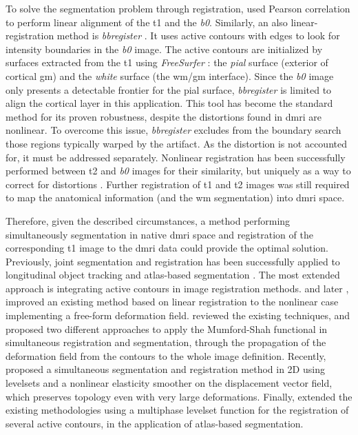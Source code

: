 To solve the segmentation problem through registration, \cite{saad_new_2009} 
  used Pearson correlation to perform linear alignment of the \gls*{t1} and 
  the \emph{b0}.
Similarly, an also linear-registration method is \emph{bbregister} \citep{greve_accurate_2009}.
It uses active contours with edges to look for intensity boundaries in the \emph{b0}
  image.
The active contours are initialized by surfaces extracted from the 
  \gls*{t1} using \emph{FreeSurfer} \citep{fischl_freesurfer_2012}:
  the \emph{pial} surface (exterior of cortical \gls*{gm}) and the \emph{white}
  surface (the \gls*{wm}/\gls*{gm} interface). 
Since the \emph{b0} image only presents a detectable frontier for the pial surface,
  \emph{bbregister} is limited to align the cortical layer in this
  application.
This tool has become the standard method for its proven robustness, despite the 
  distortions found in \gls*{dmri} are nonlinear.
To overcome this issue, \emph{bbregister} excludes from the boundary search those
  regions typically warped by the artifact.
As the distortion is not accounted for, it must be addressed separately.
Nonlinear registration has been successfully performed between \gls*{t2} and \emph{b0}
  images for their similarity, but uniquely as a way to correct for distortions
  \citep{kybic_unwarping_2000,studholme_accurate_2000,wu_comparison_2008,tao_variational_2009}.
Further registration of \gls*{t1} and \gls*{t2} images was still required to map the anatomical
  information (and the \gls*{wm} segmentation) into \gls*{dmri} space.

Therefore, given the described circumstances, a method performing simultaneously
  segmentation in native \gls*{dmri} space and registration of the corresponding \gls*{t1} image
  to the \gls*{dmri} data could provide the optimal solution.
Previously, joint segmentation and registration has been successfully applied to
  longitudinal object tracking \citep{paragios_level_2003} and atlas-based
  segmentation \citep{gorthi_active_2011}.
The most extended approach is integrating active contours in image registration 
  methods.
\cite{unal_coupled_2005} and later \cite{wang_joint_2006},
  improved an existing method \citep{yezzi_variational_2003} based on linear registration
  to the nonlinear case implementing a free-form deformation field.
\cite{droske_mumfordshah_2009} reviewed the existing techniques, and proposed two different
  approaches to apply the Mumford-Shah functional \citep{mumford_optimal_1989} in simultaneous
  registration and segmentation, through the propagation of the deformation field from
  the contours to the whole image definition.
Recently, \cite{guyader_combined_2011} proposed a simultaneous segmentation and
  registration method in 2D using levelsets and a nonlinear elasticity smoother on the
  displacement vector field, which preserves topology even with very large deformations.
Finally, \cite{gorthi_active_2011} extended the existing methodologies using a multiphase
  levelset function for the registration of several active contours, in the application
  of atlas-based segmentation.
  
